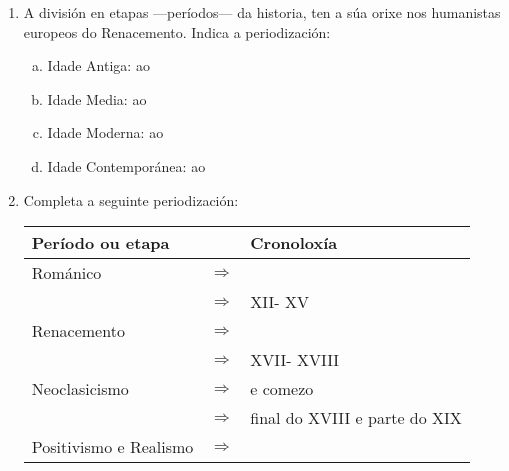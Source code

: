 \begin{ejercicio}
 \begin{enumerate}[1)]
  \item 
A división en etapas ---períodos--- da historia, ten a súa orixe nos humanistas europeos do Renacemento. Indica a periodización:

\begin{enumerate}[a)]
 \item
 Idade Antiga: \dotfill ao  \dotfill \hspace{0.5cm}
 \item
 Idade Media:  \dotfill ao  \dotfill  \hspace{0.5cm}
 \item
 Idade Moderna:  \dotfill ao  \dotfill  \hspace{0.5cm}
 \item
 Idade Contemporánea:  \dotfill ao  \dotfill  \hspace{0.5cm} 
\end{enumerate}
\item
Completa a seguinte periodización:
\par
\begin{center}
\begin{tabular}{lcl}
Período ou etapa &  & Cronoloxía \\
\hline
Románico & $\Rightarrow$ &  \\
       & $\Rightarrow$ & XII- XV \\
Renacemento & $\Rightarrow$ & \\
& $\Rightarrow$ & XVII- XVIII \\
Neoclasicismo & $\Rightarrow$ & \dotfill e comezo \dotfill \\
 & $\Rightarrow$ & final do XVIII e parte do XIX \\
Positivismo e Realismo & $\Rightarrow$ &  \\
\hline
\end{tabular}
\end{center}
\end{enumerate}

\end{ejercicio}
%

